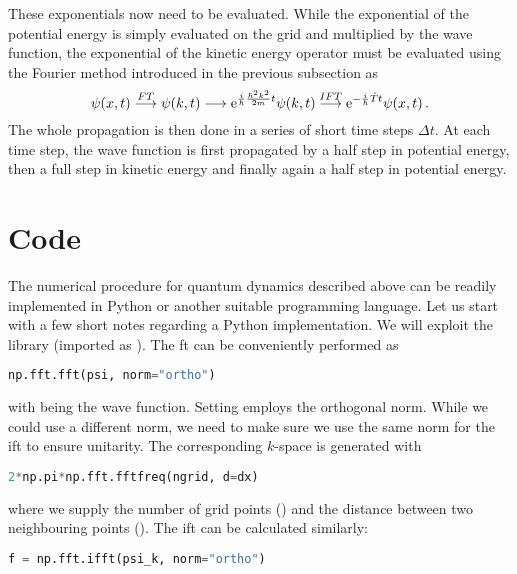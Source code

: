 These exponentials now need to be evaluated. While the exponential of the potential energy is simply evaluated on the grid and multiplied by the wave function, the exponential of the kinetic energy operator must be evaluated using the Fourier method introduced in the previous subsection as
\begin{equation}
    \psi(x,t) \stackrel{FT}{\longrightarrow} \psi(k,t) \longrightarrow \mathrm{e}^{\frac{i}{\hbar} \frac{\hbar^2 k^2}{2m} t} \psi(k,t) \stackrel{IFT}{\longrightarrow} \mathrm{e}^{-\frac{i}{\hbar} \hat{T} t}\psi(x,t) \, .
\end{equation}
The whole propagation is then done in a series of short time steps $\Delta t$. At each time step, the wave function is first propagated by a half step in potential energy, then a full step in kinetic energy and finally again a half step in potential energy. 


\section{Code}

The numerical procedure for quantum dynamics described above can be readily implemented in Python or another suitable programming language. Let us start with a few short notes regarding a Python implementation. We will exploit the  library (imported as ). The \acrlong{ft} can be conveniently performed as
\begin{lstlisting}[language=Python, style=mystyle2]
np.fft.fft(psi, norm="ortho")
\end{lstlisting}
with  being the wave function. Setting  employs the orthogonal norm. While we could use a different norm, we need to make sure we use the same norm for the \acrshort{ift} to ensure unitarity. The corresponding $k$-space is generated with
\begin{lstlisting}[language=Python, style=mystyle2]
2*np.pi*np.fft.fftfreq(ngrid, d=dx)
\end{lstlisting}
where we supply the number of grid points () and the distance between two neighbouring points (). The \acrlong{ift} can be calculated similarly: 
\begin{lstlisting}[language=Python, style=mystyle2]
f = np.fft.ifft(psi_k, norm="ortho")
\end{lstlisting}

